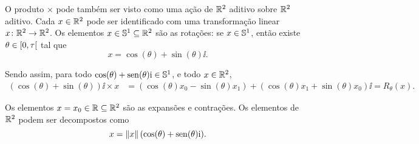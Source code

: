 O produto $\times$ pode também ser visto como uma ação de $\R^2$ aditivo sobre $\R^2$ aditivo. Cada $x \in \R^2$ pode ser identificado com uma transformação linear $x\colon \R^2 \to \R^2$. Os elementos $x \in \S^1 \subseteq \R^2$ são as rotações: se $x \in \S^1$, então existe $\theta \in \intfa{0}{\tau}$ tal que
	\begin{equation*}
	x = \cos(\theta) + \sin(\theta) \ii.
	\end{equation*}

\begin{comment}
Isso ocorre porque, se $x \in \S^1$, então $\nor{x} = 1$, logo $({x_0}^2+{x_1}^2)^\frac{1}{2} = 1$, portanto ${x_0}^2+{x_1}^2 = 1$. Então $\abs{x_0} \leq 1$, ou seja, $-1 \leq x_0 \leq 1$. Definido $\phi := \cos\inv(x_0) \in \intff{0}{\tau \div 2}$, temos que ${x_1}^2 = 1-\cos(\theta)^2$, logo $\abs{x_1} = (1-\cos(\theta)^2)^\frac{1}{2}$, então $x_1 = \pm\sin(\theta)$. Definimos então
	\begin{equation*}
	\theta :=	\begin{cases}
		\cos\inv\left(\frac{x_0}{\nor{x}}\right),			& x_1 > 0 \ou x_0 = 1, \\
		\tau - \cos\inv\left(\frac{x_0}{\nor{x}}\right)		& x_1 < 0 \ou x_0 = -1.
		\end{cases}
	\end{equation*}
\end{comment}

Sendo assim, para todo $\cos(\theta) + \sin(\theta) \ii \in \S^1$, e todo $x \in \R^2$,
	\begin{align*}
	(\cos(\theta) + \sin(\theta)) \ii \times x &= (\cos(\theta)x_0-\sin(\theta)x_1) +(\cos(\theta)x_1+\sin(\theta)x_0) \ii = R_\theta(x).
	\end{align*}

Os elementos $x = x_0 \in \R \subseteq \R^2$ são as expansões e contrações. Os elementos de $\R^2$ podem ser decompostos como
	\begin{equation*}
	x = \nor{x}(\cos(\theta) + \sin(\theta) \ii).
	\end{equation*}


